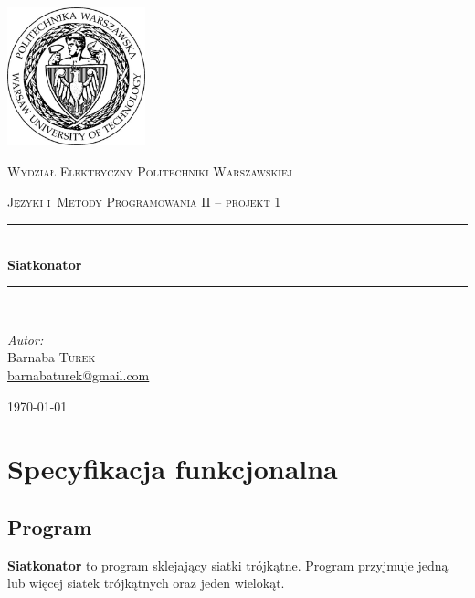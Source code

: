 \documentclass[a4paper]{article} \usepackage{setspace}
\newcommand{\HRule}{\rule{\linewidth}{0.5mm}}
\newcommand{\siatkonator}{\textbf{Siatkonator} }
\begin{document}
\begin{titlepage}

  \begin{center}


    \includegraphics[width=0.3\textwidth]{logo.jpg}\\[1cm]

    \begin{onehalfspace}
      \textsc{\LARGE Wydział Elektryczny Politechniki Warszawskiej}\\[1.5cm]
    \end{onehalfspace}



    \textsc{Języki i~Metody Programowania II -- projekt 1}\\[0.5cm]

    \HRule \\[0.4cm]
    {\huge \bfseries Siatkonator }\\[0.2cm]
    \HRule \\[1.5cm]

    \begin{flushleft} \large
      \emph{Autor:}\\
      Barnaba \textsc{Turek}\\
      \href{mailto:barnabaturek@gmail.com}{barnabaturek@gmail.com}
    \end{flushleft}
    \vfill

    {\large \today}

  \end{center}

\end{titlepage}
\sloppy

\setcounter{tocdepth}{4}
\tableofcontents

\section{Specyfikacja funkcjonalna}
\subsection{Program}
\siatkonator to program sklejający siatki trójkątne.
Program przyjmuje jedną lub więcej siatek trójkątnych oraz jeden wielokąt.
\end{document}

